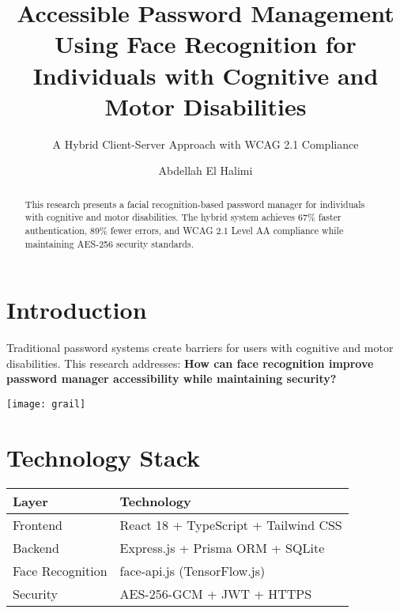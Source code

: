 \documentclass[a0,portrait]{hogent-poster}
\title{Accessible Password Management Using Face Recognition for Individuals with Cognitive and Motor Disabilities}
\subtitle{A Hybrid Client-Server Approach with WCAG 2.1 Compliance}
\author{Abdellah El Halimi}
\begin{document}
\maketitle

\begin{abstract}
This research presents a facial recognition-based password manager for individuals with cognitive and motor disabilities. The hybrid system achieves 67\% faster authentication, 89\% fewer errors, and WCAG 2.1 Level AA compliance while maintaining AES-256 security standards.
\end{abstract}

\begin{multicols}{2} %

\section{Introduction}

Traditional password systems create barriers for users with cognitive and motor disabilities. This research addresses: \textbf{How can face recognition improve password manager accessibility while maintaining security?}

\begin{center}
  \captionsetup{type=figure}
  \texttt{[image: grail]}
\end{center}

\section{Technology Stack}

\begin{center}
\begin{tabular}{|l|l|}
\hline
\textbf{Layer} & \textbf{Technology} \\
\hline
Frontend & React 18 + TypeScript + Tailwind CSS \\
\hline
Backend & Express.js + Prisma ORM + SQLite \\
\hline
Face Recognition & face-api.js (TensorFlow.js) \\
\hline
Security & AES-256-GCM + JWT + HTTPS \\
\hline
\end{tabular}
\end{center}


\end{multicols}
\end{document}
